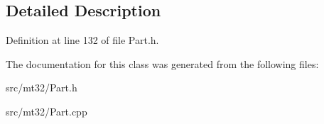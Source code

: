 \subsection{Detailed Description}


Definition at line 132 of file Part.\-h.



The documentation for this class was generated from the following files\-:\begin{DoxyCompactItemize}
\item 
src/mt32/Part.\-h\item 
src/mt32/Part.\-cpp\end{DoxyCompactItemize}
